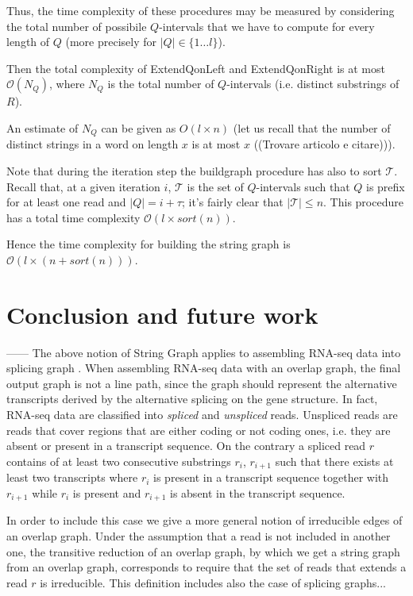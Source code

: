 \documentclass[runningheads,envcountsame,a4paper]{llncs}
\begin{document}
Thus, the time complexity of these procedures may be measured by considering the total number of possibile $Q$-intervals that we have to compute for every length of $Q$ (more precisely for $|Q| \in \{1 \dots l\}$).

Then the total  complexity of ExtendQonLeft and ExtendQonRight is at most $\mathcal{O}(N_Q)$, where $N_Q$ is the total number of $Q$-intervals (i.e. distinct substrings of $R$).

An estimate of $N_Q$ can be given as $O(l \times n)$ (let us recall that the number of distinct strings in a word on length $x$ is  at most $x$  ((Trovare articolo e citare))).

Note that during the iteration step the buildgraph procedure has also to sort $\mathcal{T}$. Recall that, at a given iteration $i$, $\mathcal{T}$ is the set of $Q$-intervals such that $Q$ is prefix for at least one read and $|Q| = i + \tau$; it's fairly clear that $|\mathcal{T}| \leq n$. This procedure has a total time complexity $\mathcal{O}(l \times sort(n))$.

Hence the time complexity for building the string graph is $\mathcal{O}(l \times (n + sort(n)))$. %



\section{Conclusion and future work}
------
The above  notion of String Graph applies to   assembling RNA-seq data into splicing graph \cite{Beretta2013}.
When assembling RNA-seq data with an overlap graph, the final output graph is not a line path, since the graph should represent the alternative transcripts derived by the alternative splicing
on the gene structure. In fact, RNA-seq data are classified into {\em spliced} and  {\em  unspliced} reads. Unspliced reads are reads that cover regions that are either coding or not coding ones, i.e. they are absent or present in a transcript sequence. On the contrary a  spliced read $r$ contains  of  at least two consecutive substrings   $r_i $, $r_{i+1}$ such that  there exists at least two transcripts where  $r_i$ is present in a transcript sequence  together with $r_{i+1}$ while $r_i$ is present and $r_{i+1}$ is absent in the transcript sequence.

In order to include this case we give a more general notion of irreducible edges of an overlap graph. Under the assumption that a read is not included in another one, the transitive reduction of an overlap graph, by which we get a string graph from an overlap graph, corresponds to require that the set of reads that extends a read $r$ is irreducible. This definition includes also the case of  splicing graphs...



\end{document}
